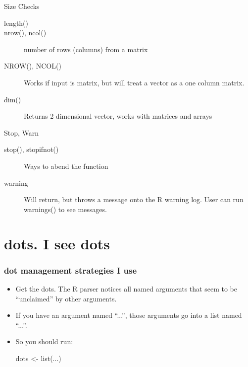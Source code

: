 \documentclass[11pt,english]{beamer}
\begin{document}
\begin{frame}
\begin{alertblock}{Size Checks}
  \begin{description}
  \item [length()]
  \item [nrow(), ncol()] number of rows (columns) from a matrix
  \item [NROW(), NCOL()] Works if input is matrix, but will treat a
    vector as a one column matrix.
  \item [dim()] Returns 2 dimensional vector, works with matrices and arrays
  \end{description}
\end{alertblock}

\begin{alertblock}{Stop, Warn}
  \begin{description}
  \item[stop(), stopifnot()] Ways to abend the function
  \item[warning] Will return, but throws a message onto the R
    warning log. User can run warnings() to see messages.
  \end{description}
\end{alertblock}

\end{frame}

\section{dots. I see dots}

\begin{frame}
  \frametitle{dot management strategies I use}
  \begin{itemize} 
  \item Get the dots. The R parser notices all named
    arguments that seem to be ``unclaimed'' by other arguments.
  \item If you have an argument named ``...'', those arguments
    go into a list named ``...''.
  \item So you should run:
    \begin{Sinput}
      dots <- list(...)
    \end{Sinput}
 
  \end{itemize}
\end{frame} 
\end{document}
